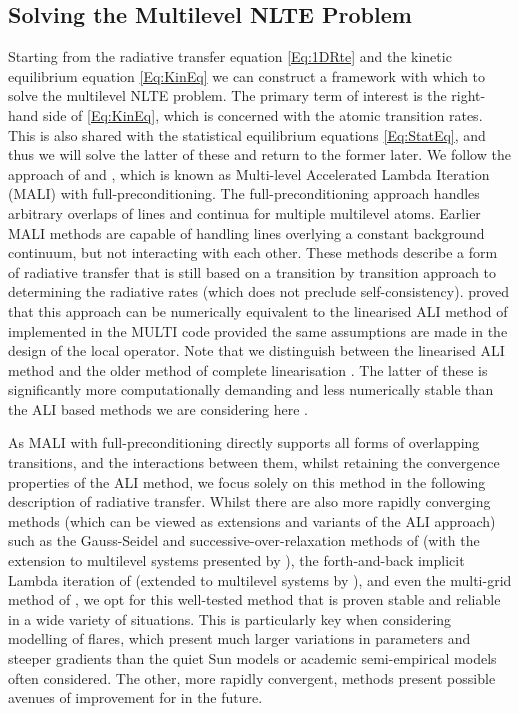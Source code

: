\subsection{Solving the Multilevel NLTE Problem}\label{Sec:MALI}

Starting from the radiative transfer equation \eqref{Eq:1DRte} and the kinetic equilibrium equation \eqref{Eq:KinEq} we can construct a framework with which to solve the multilevel NLTE problem.
The primary term of interest is the right-hand side of \eqref{Eq:KinEq}, which is concerned with the atomic transition rates.
This is also shared with the statistical equilibrium equations \eqref{Eq:StatEq}, and thus we will solve the latter of these and return to the former later.
We follow the approach of \citet{Rybicki1992} and \citet{Uitenbroek2001}, which is known as Multi-level Accelerated Lambda Iteration (MALI) with full-preconditioning.
The full-preconditioning approach handles arbitrary overlaps of lines and continua for multiple multilevel atoms.
Earlier MALI methods \citep{Rybicki1991} are capable of handling lines overlying a constant background continuum, but not interacting with each other.
These methods describe a form of radiative transfer that is still based on a transition by transition approach to determining the radiative rates (which does not preclude self-consistency).
\citet{SocasNavarro1997} proved that this approach can be numerically equivalent to the linearised ALI method of \citet{Scharmer1985} implemented in the MULTI code \citep{Carlsson1986,Carlsson1992} provided the same assumptions are made in the design of the local operator.
Note that we distinguish between the linearised ALI method and the older method of complete linearisation \citep[e.g. ][]{Auer1969, Auer1973, Auer1976}.
The latter of these is significantly more computationally demanding and less numerically stable than the ALI based methods we are considering here \citep[a comparison of MULTI and LINEAR-B is shown in][]{Carlsson1986}.

As MALI with full-preconditioning directly supports all forms of overlapping transitions, and the interactions between them, whilst retaining the convergence properties of the ALI method, we focus solely on this method in the following description of radiative transfer.
Whilst there are also more rapidly converging methods (which can be viewed as extensions and variants of the ALI approach) such as the Gauss-Seidel and successive-over-relaxation methods of \citet{TrujilloBueno1995} (with the extension to multilevel systems presented by \citet{Paletou2007}), the forth-and-back implicit Lambda iteration of \citet{AtanackovicVukmanovic1997} (extended to multilevel systems by \citet{Kuzmanovska2017}), and even the multi-grid method of \citet{FabianiBendicho1997}, we opt for this well-tested method that is proven stable and reliable in a wide variety of situations.
This is particularly key when considering modelling of flares, which present much larger variations in parameters and steeper gradients than the quiet Sun models or academic semi-empirical models often considered.
The other, more rapidly convergent, methods present possible avenues of improvement for \Lw{} in the future.

